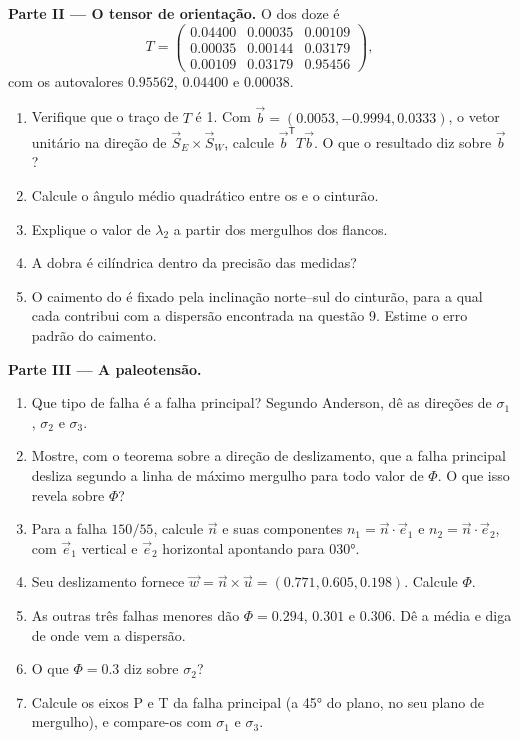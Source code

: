 \begin{problem}
\medskip\noindent\textbf{Parte II --- O tensor de orientação.}
O  dos doze  é
\[
  T = \begin{pmatrix} 0.04400 & 0.00035 & 0.00109\\ 0.00035 & 0.00144 & 0.03179\\
  0.00109 & 0.03179 & 0.95456 \end{pmatrix},
\]
com os autovalores $0.95562$, $0.04400$ e $0.00038$.
\begin{enumerate}[resume]
  \item Verifique que o traço de $T$ é 1. Com $\vec b = (0.0053, -0.9994,
        0.0333)$, o vetor unitário na direção de $\vec S_E\times\vec S_W$, calcule
        $\vec b^{\mathsf T}T\vec b$. O que o resultado diz sobre $\vec b$?
  \item Calcule o ângulo médio quadrático entre os  e o cinturão.
  \item Explique o valor de $\lambda_2$ a partir dos mergulhos dos flancos.
  \item A dobra é cilíndrica dentro da precisão das medidas?
  \item O caimento do  é fixado pela inclinação norte--sul do
        cinturão, para a qual cada  contribui com a dispersão encontrada na
        questão 9. Estime o erro padrão do caimento.
\end{enumerate}

\medskip\noindent\textbf{Parte III --- A paleotensão.}
\begin{enumerate}[resume]
  \item Que tipo de falha é a falha principal? Segundo Anderson, dê as
        direções de $\sigma_1$, $\sigma_2$ e $\sigma_3$.
  \item Mostre, com o teorema sobre a direção de deslizamento, que a falha principal
        desliza segundo a linha de máximo mergulho para todo valor de $\Phi$. O que isso
        revela sobre $\Phi$?
  \item Para a falha $150/55$, calcule $\vec n$ e suas componentes $n_1 =
        \vec n\cdot\vec e_1$ e $n_2 = \vec n\cdot\vec e_2$, com $\vec e_1$
        vertical e $\vec e_2$ horizontal apontando para \ang{030}.
  \item Seu deslizamento fornece $\vec w = \vec n\times\vec u = (0.771, 0.605, 0.198)$.
        Calcule $\Phi$.
  \item As outras três falhas menores dão $\Phi = 0.294$, $0.301$ e
        $0.306$. Dê a média e diga de onde vem a dispersão.
  \item O que $\Phi = 0.3$ diz sobre $\sigma_2$?
  \item Calcule os eixos P e T da falha principal (a \ang{45} do
        plano, no seu plano de mergulho), e compare-os com $\sigma_1$ e
        $\sigma_3$.
\end{enumerate}


\end{problem}
